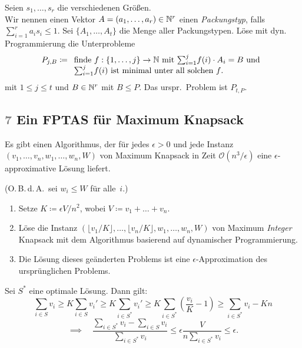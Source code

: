 \documentclass{cheat-sheet}
\renewcommand{\O}{\mathcal{O}} %
\newcommand{\floor}[1]{\lfloor #1 \rfloor} %
\newcommand{\Problem}[1]{\textcolor{ProblemColor}{\textbf{#1}}}
\newcommand{\scriptSection}[1]{\textcolor{gray}{#1}\enspace}
\begin{document}
\begin{alg}
  Seien $s_1, \ldots, s_r$ die verschiedenen Größen. \\
  Wir nennen einen Vektor $A = (a_1, \ldots, a_r) \in \mathbb{N}^r$ einen \textit{Packungstyp}, falls ${\sum}_{i=1}^r a_i s_i \leq 1$.
  Sei $\{ A_1, \ldots, A_t \}$ die Menge aller Packungstypen.
  Löse mit dyn. Programmierung die Unterprobleme
  \[
    P_{j,B} \coloneqq
      \begin{array}[t]{l}
        \text{finde $f : \{ 1, \ldots, j \} \to \N$ mit ${\sum}_{i=1}^j f(i) \cdot A_i = B$ und} \\
        \text{${\sum}_{i=1}^j f(i)$ ist minimal unter all solchen $f$.}
      \end{array}
  \]
  mit $1 \leq j \leq t$ und $B \in \mathbb{N}^r$ mit $B \leq P$.
  Das urspr.\ Problem ist $P_{t,P}$.
\end{alg}


\subsection{\scriptSection{7} Ein FPTAS für \Problem{Maximum Knapsack}}

\begin{satz}
  Es gibt einen Algorithmus, der für jedes $\epsilon > 0$ und jede Instanz $(v_1, \ldots, v_n, w_1, \ldots, w_n, W)$ von Maximum Knapsack in Zeit $\O(n^3 / \epsilon)$ eine $\epsilon$-approximative Lösung liefert.
\end{satz}

\begin{alg}
  (O.\,B.\,d.\,A.\ sei $w_i \leq W$ für alle~$i$.)
  \begin{enumerate}
    \item Setze $K \coloneqq \epsilon V / n^2$, wobei $V \coloneqq v_1 + \ldots + v_n$.
    \item Löse die Instanz $(\floor{v_1/K}, \ldots, \floor{v_n/K}, w_1, \ldots, w_n, W)$ von Maximum \textit{Integer} Knapsack mit dem Algorithmus basierend auf dynamischer Programmierung.
    \item Die Lösung dieses geänderten Problems ist eine $\epsilon$-Approximation des ursprünglichen Problems.
  \end{enumerate}
\end{alg}

\begin{beweisskizze}
  Sei $S^*$ eine optimale Lösung.
  Dann gilt:
  \[
    \sum_{i \in S} v_i
    \geq K \sum_{i \in S} v_i'
    \geq K \sum_{i \in S^*} v_i'
    \geq K \sum_{i \in S^*} (\frac{v_i}{K} - 1)
    \geq \sum_{i \in S^*} v_i - K n
  \]
  \[
    \implies \quad
    \frac{{\sum}_{i \in S^*} v_i - {\sum}_{i \in S} v_i}{{\sum}_{i \in S^*} v_i}
    \leq \epsilon \frac{V}{n {\sum}_{i \in S^*} v_i}
    \leq \epsilon.
  \]
\end{beweisskizze}
\end{document}
